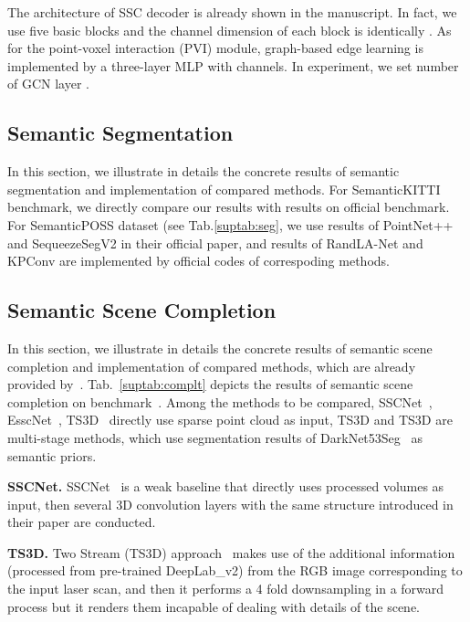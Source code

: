 \documentclass[letterpaper]{article} \usepackage{aaai21}  \usepackage{times}  \usepackage{helvet} \usepackage{courier}  \usepackage[hyphens]{url}  \usepackage{graphicx} \urlstyle{rm} \def\UrlFont{\rm}  \usepackage{natbib}  \usepackage{booktabs}
\begin{document}
	The architecture of SSC decoder is already shown in the manuscript. 
In fact, we use five basic blocks and the channel dimension of each block is identically . 
As for the point-voxel interaction (PVI) module, graph-based edge learning is implemented by a three-layer MLP with  channels.
In experiment, we set number of GCN layer .




	
	\subsection{Semantic Segmentation}
	In this section, we illustrate in details the concrete results of semantic segmentation and implementation of compared methods.
For SemanticKITTI benchmark, we directly compare our results with results on official benchmark.
For SemanticPOSS dataset (see Tab.\ref{suptab:seg}, we use results of PointNet++ and SequeezeSegV2 in their official paper, and results of RandLA-Net and KPConv are implemented by official codes of correspoding methods.
	
	\subsection{Semantic Scene Completion} 
	In this section, we illustrate in details the concrete results of semantic scene completion and implementation of compared methods, which are already provided by~\cite{behley2019semantickitti}. Tab.~\ref{suptab:complt} depicts the results of semantic scene completion on benchmark~\cite{behley2019semantickitti}.
Among the methods to be compared, SSCNet~\cite{Song2017Semantic}, EsscNet~\cite{Jiahui2019Efficient}, TS3D~\cite{garbade2019two} directly use sparse point cloud as input, TS3D and TS3D are multi-stage methods, which use segmentation results of DarkNet53Seg~\cite{behley2019semantickitti} as semantic priors.  
	
	\noindent\textbf{SSCNet.} SSCNet~\cite{Song2017Semantic} is a weak baseline that directly uses processed volumes as input, then several 3D convolution layers with the same structure introduced in their paper are conducted. 
	
	\noindent\textbf{TS3D.} Two Stream (TS3D) approach~\cite{garbade2019two} makes use of the additional information (processed from pre-trained DeepLab\_v2) from the RGB image corresponding to the input laser scan, and then it performs a 4 fold downsampling in a forward process but it renders them incapable of dealing with details of the scene.
	
\end{document}
